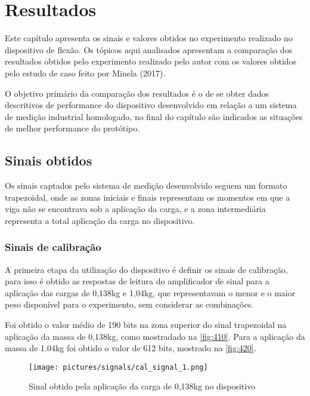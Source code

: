 
\chapter{Resultados}\label{ch:capitulo_resultados}

Este capítulo apresenta os sinais e valores obtidos no experimento realizado no dispositivo de flexão.
Os tópicos aqui analisados apresentam a comparação dos resultados obtidos pelo experimento realizado pelo autor com os valores obtidos pelo
estudo de caso feito por Minela (2017).

O objetivo primário da comparação dos resultados é o de se obter dados descritivos de performance do dispositivo desenvolvido em relação a um sistema de medição industrial
homologado, no final do capítulo são indicados as situações de melhor performance do protótipo.

\section{Sinais obtidos}

Os sinais captados pelo sistema de medição desenvolvido seguem um formato trapezoidal, onde as zonas iniciais e finais representam os momentos em que a viga não se encontrava
sob a aplicação da carga, e a zona intermediária representa a total aplicação da carga no dispositivo.

\subsection{Sinais de calibração}

A primeira etapa da utilização do dispositivo é definir os sinais de calibração, para isso é obtido as respostas de leitura do amplificador de sinal para a aplicação das cargas
de 0,138kg e 1,04kg, que representavam o menor e o maior peso disponível para o experimento, sem considerar as combinações.

Foi obtido o valor médio de 190 bits na zona superior do sinal trapezoidal na aplicação da massa de 0,138kg, como mostradado na \autoref{fig:410}.
Para a aplicação da massa de 1.04kg foi obtido o valor de 612 bits, mostrado na \autoref{fig:420}.

\begin{figure}[H]
	\caption{\label{fig:410} Sinal obtido pela aplicação da carga de 0,138kg no dispositivo}
	\begin{center}
		\texttt{[image: pictures/signals/cal\_signal\_1.png]}
	\end{center}
\end{figure}

